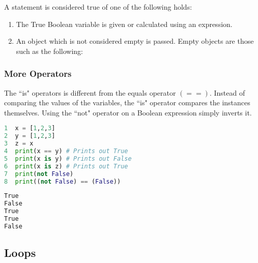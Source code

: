 \documentclass[crop=false,class=book]{standalone}
\begin{document}
A statement is considered true of one of the following holds:
\begin{enumerate}
    \item The True Boolean variable is given or calculated using an expression.
    \item An object which is not considered empty is passed. Empty objects are those such as the following:
    \begin{enumerate}
    \end{enumerate}
\end{enumerate}
\subsubsection{More Operators}
The ``is" operators is different from the equals operator $(==)$. Instead of comparing the values of the variables, the ``is" operator compares the instances themselves. Using the ``not" operator on a Boolean expression simply inverts it.
\newpage
\begin{minipage}[t]{.48\textwidth}
\centering
\begin{lstlisting}[language=python,frame=single,basicstyle=\footnotesize,frame=single,caption=input]
1  x = [1,2,3]
2  y = [1,2,3]
3  z = x
4  print(x == y) # Prints out True
5  print(x is y) # Prints out False
6  print(x is z) # Prints out True
7  print(not False)
8  print((not False) == (False))
\end{lstlisting}
\end{minipage}\hfill
\begin{minipage}[t]{.48\textwidth}
\centering
\begin{lstlisting}[language=bash,basicstyle=\small\ttfamily,frame=single,caption=output]
True
False
True
True
False
\end{lstlisting}
\end{minipage}
\subsection{Loops}
\end{document}
